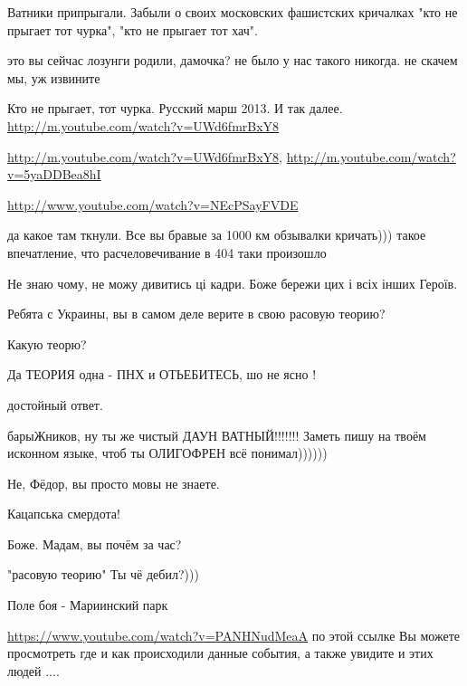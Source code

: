 
Ватники припрыгали. Забыли о своих московских фашистских кричалках "кто не
прыгает тот чурка", "кто не прыгает тот хач".

\begin{itemize} %
это вы сейчас лозунги родили, дамочка? не было у нас такого никогда. не скачем мы, уж извините

Кто не прыгает, тот чурка. Русский марш 2013. И так далее. \url{http://m.youtube.com/watch?v=UWd6fmrBxY8}

\url{http://m.youtube.com/watch?v=UWd6fmrBxY8}, \url{http://m.youtube.com/watch?v=5yaDDBea8hI}

\url{http://www.youtube.com/watch?v=NEcPSayFVDE}

да какое там ткнули. Все вы бравые за 1000 км обзывалки кричать))) такое
впечатление, что расчеловечивание в 404 таки произошло

\end{itemize} %

Не знаю чому, не можу дивитись ці кадри. Боже бережи цих і всіх інших Героїв.

Ребята с Украины, вы в самом деле верите в свою расовую теорию?

\begin{itemize} %
Какую теорю?

Да ТЕОРИЯ одна - ПНХ и ОТЬЕБИТЕСЬ, шо не ясно !

достойный ответ.

барыЖников, ну ты же чистый ДАУН ВАТНЫЙ!!!!!!! Заметь пишу на твоём исконном языке, чтоб ты ОЛИГОФРЕН всё понимал))))))

Не, Фёдор, вы просто мовы не знаете.

Кацапська смердота!

Боже. Мадам, вы почём за час?

"расовую теорию" Ты чё дебил?)))
\end{itemize} %

Поле боя - Мариинский парк

\url{https://www.youtube.com/watch?v=PANHNudMeaA} по этой ссылке Вы можете просмотреть где и как происходили данные события, а также увидите и этих людей ....

